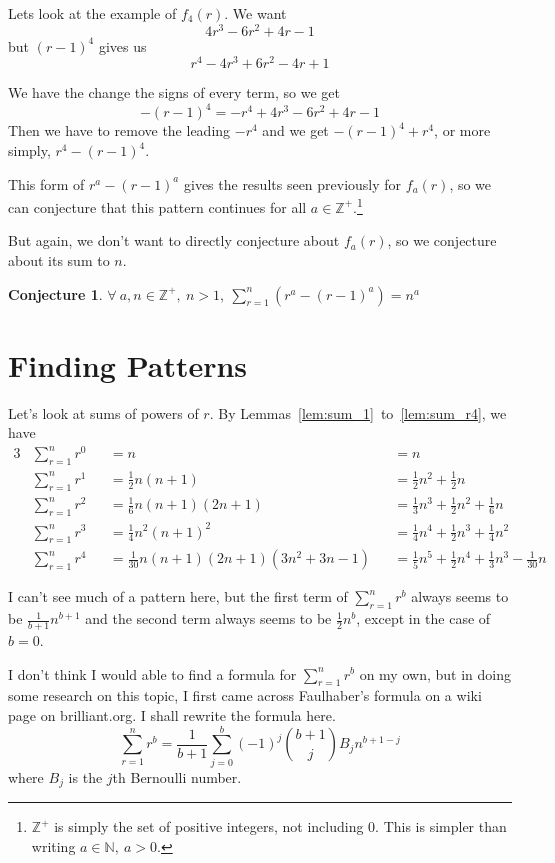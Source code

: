 \documentclass[a4paper]{article}
\newcommand{\sn}{\sum\limits_{r=1}^{n}}
\newcommand{\inn}{\in \mathbb{N}}
\newcommand{\oo}[1]{\frac{1}{#1}}
\newcommand{\zp}{\mathbb{Z}^+}
\newtheorem{conjecture}{Conjecture}
\begin{document}
Lets look at the example of $f_4(r)$. We want $$4r^3 - 6r^2 + 4r - 1$$ but $(r-1)^4$ gives us $$r^4 - 4r^3 + 6r^2 - 4r + 1$$

We have the change the signs of every term, so we get $$-(r-1)^4 = -r^4 + 4r^3 - 6r^2 + 4r - 1$$ Then we have to remove the leading $-r^4$ and we get $-(r-1)^4 + r^4$, or more simply, $r^4 - (r-1)^4$.

This form of $r^a - (r-1)^a$ gives the results seen previously for $f_a(r)$, so we can conjecture that this pattern continues for all $a \in \zp$.\footnote{$\zp$ is simply the set of positive integers, not including 0. This is simpler than writing $a \inn,\ a > 0$.}

But again, we don't want to directly conjecture about $f_a(r)$,  so we conjecture about its sum to $n$.
\begin{conjecture}
$\displaystyle \forall\ a, n \in \zp,\ n > 1,\ \sn \left(r^a - (r - 1)^a\right) = n^a$
\label{conj:fa_sum}
\end{conjecture}

\vspace*{\fill} %

\section{Finding Patterns}

Let's look at sums of powers of $r$. By Lemmas~\ref{lem:sum_1}~to~\ref{lem:sum_r4}, we have
\begin{alignat*}{3}
&\sn r^0 &&= n &&= n\\
&\sn r^1 &&= \oo{2}n(n + 1) &&= \oo{2}n^2 + \oo{2}n\\
&\sn r^2 &&= \oo{6}n(n + 1)(2n + 1) &&= \oo{3}n^3 + \oo{2}n^2 + \oo{6}n\\
&\sn r^3 &&= \oo{4}n^2(n + 1)^2 &&= \oo{4}n^4 + \oo{2}n^3 + \oo{4}n^2\\
&\sn r^4 &&= \oo{30}n(n + 1)(2n + 1)\left(3n^2 + 3n - 1\right) &&= \oo{5}n^5 + \oo{2}n^4 + \oo{3}n^3 - \oo{30}n
\end{alignat*}

I can't see much of a pattern here, but the first term of $\sn r^b$ always seems to be $\oo{b+1}n^{b+1}$ and the second term always seems to be $\oo{2}n^{b}$, except in the case of $b = 0$.

I don't think I would able to find a formula for $\sn r^b$ on my own, but in doing some research on this topic, I first came across Faulhaber's formula on a wiki page on brilliant.org\cite{brilliant.org-sums-wiki}. I shall rewrite the formula here. $$\sn r^b = \oo{b+1} \sum_{j=0}^b (-1)^j \binom{b+1}{j} B_j n^{b+1-j}$$ where $B_j$ is the $j$th Bernoulli number.
\end{document}

